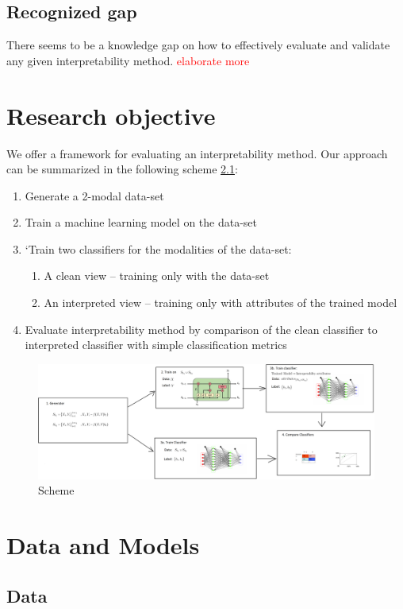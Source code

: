 \documentclass[12pt]{report}
\begin{document}
\newpage
\section{Recognized gap}

There seems to be a knowledge gap on how to effectively evaluate and validate any given interpretability method. \textcolor{red}{elaborate more }



\chapter{Research objective } 

We offer a framework for evaluating an interpretability method. Our approach can be summarized in
the following scheme \ref{scheme}:
\begin{enumerate}
	\item Generate a 2-modal data-set
	\item Train a machine learning model on the data-set
	\item`Train two classifiers for the modalities of the data-set:
	\begin{enumerate}
		\item A clean view – training only with the data-set
		\item An interpreted view – training only with attributes of the trained model 	
    \end{enumerate}
	\item Evaluate interpretability method by comparison of the clean classifier to interpreted classifier
	with simple classification metrics		
\end{enumerate}
\begin{figure}[H]
	\centering\includegraphics[width=17cm]{scheme.png}
	\caption{Scheme}
	\label{scheme}
\end{figure}
\chapter{Data and Models} 
\section{Data}
\end{document}
